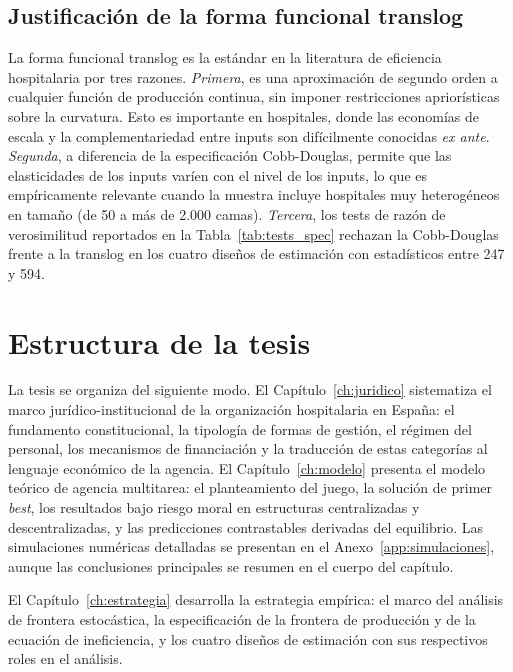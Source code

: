\subsection{Justificación de la forma funcional translog}

La forma funcional translog \citep{zuckerman1994,linna1998} es la estándar en la literatura de eficiencia hospitalaria por tres razones. \textit{Primera}, es una aproximación de segundo orden a cualquier función de producción continua, sin imponer restricciones apriorísticas sobre la curvatura. Esto es importante en hospitales, donde las economías de escala y la complementariedad entre inputs son difícilmente conocidas \textit{ex ante}. \textit{Segunda}, a diferencia de la especificación Cobb-Douglas, permite que las elasticidades de los inputs varíen con el nivel de los inputs, lo que es empíricamente relevante cuando la muestra incluye hospitales muy heterogéneos en tamaño (de 50 a más de 2.000 camas). \textit{Tercera}, los tests de razón de verosimilitud reportados en la Tabla~\ref{tab:tests_spec} rechazan la Cobb-Douglas frente a la translog en los cuatro diseños de estimación con estadísticos entre 247 y 594.

\section{Estructura de la tesis}

La tesis se organiza del siguiente modo. El Capítulo~\ref{ch:juridico} sistematiza el marco jurídico-institucional de la organización hospitalaria en España: el fundamento constitucional, la tipología de formas de gestión, el régimen del personal, los mecanismos de financiación y la traducción de estas categorías al lenguaje económico de la agencia. El Capítulo~\ref{ch:modelo} presenta el modelo teórico de agencia multitarea: el planteamiento del juego, la solución de primer \textit{best}, los resultados bajo riesgo moral en estructuras centralizadas y descentralizadas, y las predicciones contrastables derivadas del equilibrio. Las simulaciones numéricas detalladas se presentan en el Anexo~\ref{app:simulaciones}, aunque las conclusiones principales se resumen en el cuerpo del capítulo.

El Capítulo~\ref{ch:estrategia} desarrolla la estrategia empírica: el marco del análisis de frontera estocástica, la especificación de la frontera de producción y de la ecuación de ineficiencia, y los cuatro diseños de estimación con sus respectivos roles en el análisis.

